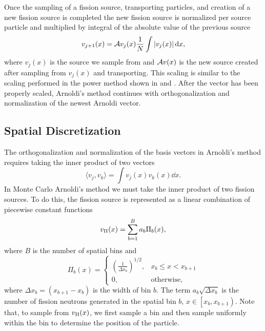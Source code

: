 Once the sampling of a fission source, transporting particles, and creation of a new fission source is completed the new fission source is normalized per source particle and multiplied by integral of the absolute value of the previous source
\begin{equation}
    v_{j+1}(x) = \mathcal{A} v_j(x) \frac{1}{N} \int |v_j(x)| \mathop{}\!\mathrm{d} x,
    \label{eq:SourceScaling}
\end{equation}
where $v_j(x)$ is the source we sample from and $\mathcal{A} v(x)$ is the new source created after sampling from $v_j(x)$ and transporting.  This scaling is similar to the scaling performed in the power method shown in  and .  After the vector has been properly scaled, Arnoldi's method continues with orthogonalization and normalization of the newest Arnoldi vector.

\subsection{Spatial Discretization \label{sec:SpatialDiscretization}}
The orthogonalization and normalization of the basis vectors in Arnoldi's method requires taking the inner product of two vectors
\begin{equation}
    \langle v_j,v_k\rangle = \int v_j(x)v_k(x) \dd x.
    \label{eq:InnerProduct}
\end{equation}
In Monte Carlo Arnoldi's method we must take the inner product of two fission sources.  To do this, the fission source is represented as a linear combination of piecewise constant functions
\begin{equation}
    v_{\Pi}(x) = \sum_{b=1}^B a_b \Pi_b(x),
    \label{eq:source_function}
\end{equation}
where $B$ is the number of spatial bins and 
\begin{equation}
    \Pi_b(x) = \begin{cases}
        \left(\frac{1}{\Delta x_b}\right)^{1/2}, & x_b \leq x < x_{b+1} \\
        0, & \mathrm{otherwise},
    \end{cases}
    \label{eq:PiFunction}
\end{equation}
where $\Delta x_b = \left(x_{b+1}-x_b\right)$ is the width of bin $b$.  The term $a_b\sqrt{\Delta x_b}$ is the number of fission neutrons generated in the spatial bin $b$, \mbox{$x \in \left[x_b, x_{b+1}\right)$}.  Note that, to sample from $v_{\Pi}(x)$, we first sample a bin and then sample uniformly within the bin to determine the position of the particle.

